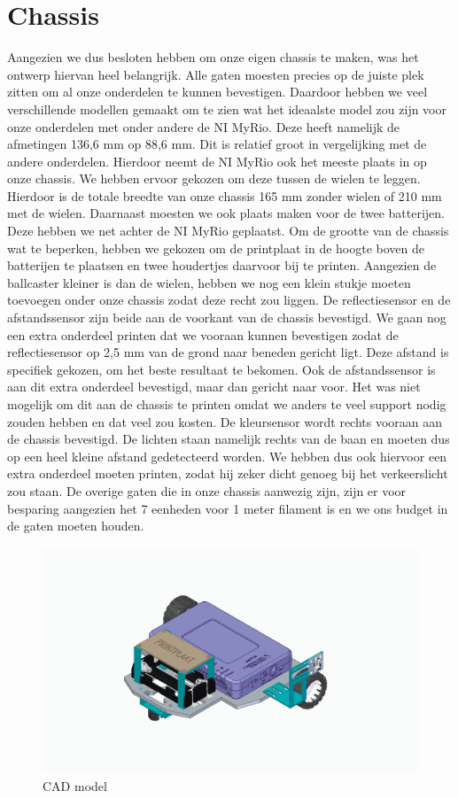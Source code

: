 \documentclass[twoside,kulak]{kulakreport} %
\begin{document}
	\section{Chassis}
	Aangezien we dus besloten hebben om onze eigen chassis te maken, was het ontwerp hiervan heel belangrijk. Alle gaten moesten precies op de juiste plek zitten om al onze onderdelen te kunnen bevestigen. Daardoor hebben we veel verschillende modellen gemaakt om te zien wat het ideaalste model zou zijn voor onze onderdelen met onder andere de NI MyRio. Deze heeft namelijk de afmetingen 136,6 mm op 88,6 mm. Dit is relatief groot in vergelijking met de andere onderdelen. Hierdoor neemt de NI MyRio ook het meeste plaats in op onze chassis. We hebben ervoor gekozen om deze tussen de wielen te leggen. Hierdoor is de totale breedte van onze chassis 165 mm zonder wielen of 210 mm met de wielen. Daarnaast moesten we ook plaats maken voor de twee batterijen. Deze hebben we net achter de NI MyRio geplaatst. Om de grootte van de chassis wat te beperken, hebben we gekozen om de printplaat in de hoogte boven de batterijen te plaatsen en twee houdertjes daarvoor bij te printen. Aangezien de ballcaster kleiner is dan de wielen, hebben we nog een klein stukje moeten toevoegen onder onze chassis zodat deze recht zou liggen. De reflectiesensor en de afstandssensor zijn beide aan de voorkant van de chassis bevestigd. We gaan nog een extra onderdeel printen dat we vooraan kunnen bevestigen zodat de reflectiesensor op 2,5 mm van de grond naar beneden gericht ligt. Deze afstand is specifiek gekozen, om het beste resultaat te bekomen. Ook de afstandssensor is aan dit extra onderdeel bevestigd, maar dan gericht naar voor. Het was niet mogelijk om dit aan de chassis te printen omdat we anders te veel support nodig zouden hebben en dat veel zou kosten. De kleursensor wordt rechts vooraan aan de chassis bevestigd. De lichten staan namelijk rechts van de baan en moeten dus op een heel kleine afstand gedetecteerd worden. We hebben dus ook hiervoor een extra onderdeel moeten printen, zodat hij zeker dicht genoeg bij het verkeerslicht zou staan. De overige gaten die in onze chassis aanwezig zijn, zijn er voor besparing aangezien het 7 eenheden voor 1 meter filament is en we ons budget in de gaten moeten houden. 
	\begin{figure}[h]
		\centering
		\includegraphics[width=\textwidth]{FotoChassisVerslag (1)}
		\caption{CAD model}
		\label{fig:chassis1}
	\end{figure}
\end{document}
